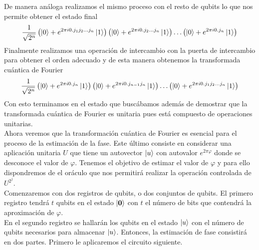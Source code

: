 \documentclass[a4paper]{article}
\numberwithin{equation}{section}
\begin{document}
De manera análoga realizamos el mismo proceso con el resto de qubits lo que nos permite obtener el estado final
\begin{equation}
\frac{1}{\sqrt{2^n}}
\left( \ket{0} + e^{2\pi i 0.j_1 j_2\ldots j_n}\ket{1} \right)
\left( \ket{0} + e^{2\pi i 0.j_2\ldots j_n}\ket{1} \right)
\ldots
\left( \ket{0} + e^{2\pi i 0.j_n}\ket{1} \right)
\end{equation}
Finalmente realizamos una operación de intercambio con la puerta de intercambio para obtener el orden adecuado y de esta manera obtenemos la transformada cuántica de Fourier
\begin{equation}
\frac{1}{\sqrt{2^n}}
\left( \ket{0} + e^{2\pi i 0.j_n}\ket{1} \right)
\left( \ket{0} + e^{2\pi i 0.j_{n-1} j_n}\ket{1} \right)
\ldots
\left( \ket{0} + e^{2\pi i 0.j_1 j_2\ldots j_n}\ket{1} \right)
\end{equation}
Con esto terminamos en el estado que buscábamos además de demostrar que la transformada cuántica de Fourier es unitaria pues está compuesto de operaciones unitarias.\\

Ahora veremos que la transformación cuántica de Fourier es esencial para el proceso de la estimación de la fase. Este último consiste en considerar una aplicación unitaria $U$ que tiene un autovector $\ket{u}$ con autovalor $e^{2\pi \varphi}$ donde se desconoce el valor de $\varphi$. Tenemos el objetivo de estimar el valor de $\varphi$ y para ello dispondremos de el oráculo que nos permitirá realizar la operación controlada de $U^{2^j}$.\\
Comenzaremos con dos registros de qubits, o dos conjuntos de qubits. El primero registro tendrá $t$ qubits en el estado $\ket{\mathbf{0}}$ con $t$ el número de bits que contendrá la aproximación de $\varphi$.\\
En el segundo registro se hallarán los qubits en el estado $\ket{u}$ con el número de qubits necesarios para almacenar $\ket{u}$. Entonces, la estimación de fase consistirá en dos partes. Primero le aplicaremos el circuito siguiente.
\end{document}
